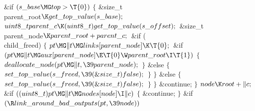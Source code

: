 \&{if} ${}(\\{s\_base}\MG\\{top}>\T{0}){}$\5
${}\{{}$\1\6
\&{size\_t} \\{parent\_root}${}\K\\{get\_top\_value}(\\{s\_base});{}$\7
${}\\{uint8\_t}\\{parent\_c}\K(\\{uint8\_t})\\{get\_top\_value}(\\{s%
\_offset});{}$\7
\&{size\_t} \\{parent\_node}${}\K\\{parent\_root}+\\{parent\_c};{}$\7
\&{if} (\\{child\_freed})\5
${}\{{}$\1\6
${}\\{pt}\MG\|t\MG\\{links}[\\{parent\_node}]\K\T{0};{}$\6
\&{if} ${}(\\{pt}\MG\|t\MG\\{aux}[\\{parent\_node}]\E\T{0}\W\\{parent\_root}\I%
\T{1}){}$\5
${}\{{}$\1\6
${}\\{deallocate\_node}(\\{pt}\MG\|t,\39\\{parent\_node});{}$\6
\4${}\}{}$\2\6
\&{else}\5
${}\{{}$\1\6
${}\\{set\_top\_value}(\\{s\_freed},\39(\&{size\_t})\,\\{false});{}$\6
\4${}\}{}$\2\6
\4${}\}{}$\2\6
\&{else}\5
${}\{{}$\1\6
${}\\{set\_top\_value}(\\{s\_freed},\39(\&{size\_t})\,\\{false});{}$\6
\4${}\}{}$\2\6
\4${}\}{}$\2\6
\&{continue};\6
\4${}\}{}$\2\6
${}\\{node}\K\\{root}+\|c;{}$\6
\&{if} ${}((\\{uint8\_t})\\{pt}\MG\|t\MG\\{nodes}[\\{node}]\I\|c){}$\5
${}\{{}$\1\6
\&{continue};\6
\4${}\}{}$\2\6
\&{if} ${}(\R\\{link\_around\_bad\_outputs}(\\{pt},\39\\{node})){}$\5

